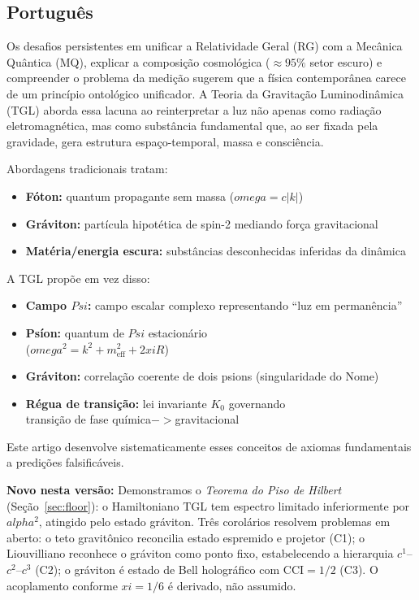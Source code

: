 \documentclass[12pt,a4paper]{article}
\def\Psi{Psi}%
\def\to{ -> }%
\def\alpha{alpha}%
\def\xi{xi}%
\def\omega{omega}%
\begin{document}
\subsection{Português}

Os desafios persistentes em unificar a Relatividade Geral (RG) com a Mecânica Quântica (MQ), explicar a composição cosmológica ($\approx 95\%$ setor escuro) e compreender o problema da medição sugerem que a física contemporânea carece de um princípio ontológico unificador. A Teoria da Gravitação Luminodinâmica (TGL) aborda essa lacuna ao reinterpretar a luz não apenas como radiação eletromagnética, mas como substância fundamental que, ao ser fixada pela gravidade, gera estrutura espaço-temporal, massa e consciência.

Abordagens tradicionais tratam:
\begin{itemize}
    \item \textbf{Fóton:} quantum propagante sem massa ($\omega = c|k|$)
    \item \textbf{Gráviton:} partícula hipotética de spin-2 mediando força gravitacional
    \item \textbf{Matéria/energia escura:} substâncias desconhecidas inferidas da dinâmica
\end{itemize}

A TGL propõe em vez disso:
\begin{itemize}
    \item \textbf{Campo $\Psi$:} campo escalar complexo representando ``luz em permanência''
    \item \textbf{Psíon:} quantum de $\Psi$ estacionário \\
    ($\omega^2 = k^2 + m_{\text{eff}}^2 + 2\xi R$)
    \item \textbf{Gráviton:} correlação coerente de dois psions (singularidade do Nome)
    \item \textbf{Régua de transição:} lei invariante $K_0$ governando \\
    transição de fase química$\to$gravitacional
\end{itemize}

Este artigo desenvolve sistematicamente esses conceitos de axiomas fundamentais a predições falsificáveis.

\textbf{Novo nesta versão:} Demonstramos o \emph{Teorema do Piso de Hilbert} (Seção~\ref{sec:floor}): o Hamiltoniano TGL tem espectro limitado inferiormente por $\alpha^2$, atingido pelo estado gráviton. Três corolários resolvem problemas em aberto: o teto gravitônico reconcilia estado espremido e projetor (C1); o Liouvilliano reconhece o gráviton como ponto fixo, estabelecendo a hierarquia $c^1$--$c^2$--$c^3$ (C2); o gráviton é estado de Bell holográfico com $\mathrm{CCI}=1/2$ (C3). O acoplamento conforme $\xi=1/6$ é derivado, não assumido.
\end{document}
